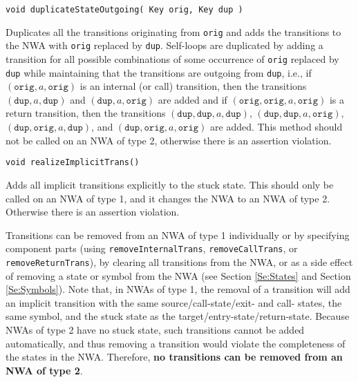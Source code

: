 \begin{description}
  \item\texttt{void duplicateStateOutgoing( Key orig, Key dup )} \nopagebreak

    Duplicates all the transitions originating from \texttt{orig} and adds
    the transitions to the NWA with \texttt{orig} replaced by \texttt{dup}.
    Self-loops are duplicated by adding a transition for all possible
    combinations of some occurrence of \texttt{orig} replaced by \texttt{dup}
    while maintaining that the transitions are outgoing from \texttt{dup},
    i.e., if $(\texttt{orig},a,\texttt{orig})$ is an internal (or call)
    transition, then the transitions $(\texttt{dup},a,\texttt{dup})$ and
    $(\texttt{dup},a,\texttt{orig})$ are added and if
    $(\texttt{orig},\texttt{orig},a,\texttt{orig})$ is a return transition,
    then the transitions $(\texttt{dup},\texttt{dup},a,\texttt{dup})$,
    $(\texttt{dup},\texttt{dup},a,\texttt{orig})$,
    $(\texttt{dup},\texttt{orig},a,\texttt{dup})$, and
    $(\texttt{dup},\texttt{orig},a,\texttt{orig})$ are added.  This method
    should not be called on an NWA of type 2, otherwise there is an assertion
    violation.

  \item\texttt{void realizeImplicitTrans()} \nopagebreak

    Adds all implicit transitions explicitly to the stuck state.  This should
    only be called on an NWA of type 1, and it changes the NWA to an NWA of
    type 2.  Otherwise there is an assertion violation. \\

\end{description} 

Transitions can be removed from an NWA of type 1 individually or by
specifying component parts (using \texttt{removeInternalTrans},
\texttt{removeCallTrans}, or \texttt{removeReturnTrans}), by clearing all
transitions from the NWA, or as a side effect of removing a state or symbol
from the NWA (see Section \ref{Se:States} and Section \ref{Se:Symbols}).
Note that, in NWAs of type 1, the removal of a transition will add an
implicit transition with the same source/call-state/exit- and call- states,
the same symbol, and the stuck state as the target/entry-state/return-state.
Because NWAs of type 2 have no stuck state, such transitions cannot be added
automatically, and thus removing a transition would violate the completeness
of the states in the NWA.  Therefore, \textbf{no transitions can be removed
  from an NWA of type 2}. \\

